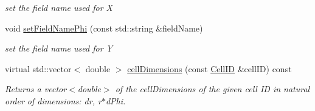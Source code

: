 \begin{DoxyCompactItemize}
\begin{DoxyCompactList}\small\item\em set the field name used for X \item\end{DoxyCompactList}\item 
void \hyperlink{class_d_d4hep_1_1_d_d_segmentation_1_1_polar_grid_r_phi2_a6cd00f3574bc968232a95d1204238c14}{setFieldNamePhi} (const std::string \&fieldName)
\begin{DoxyCompactList}\small\item\em set the field name used for Y \item\end{DoxyCompactList}\item 
virtual std::vector$<$ double $>$ \hyperlink{class_d_d4hep_1_1_d_d_segmentation_1_1_polar_grid_r_phi2_a15d4dfe8784e9ec12a6d801231925b12}{cellDimensions} (const \hyperlink{namespace_d_d4hep_1_1_d_d_segmentation_ac7af071d85cb48820914434a07e21ba1}{CellID} \&cellID) const 
\begin{DoxyCompactList}\small\item\em Returns a vector$<$double$>$ of the cellDimensions of the given cell ID in natural order of dimensions: dr, r$\ast$dPhi. \item\end{DoxyCompactList}\end{DoxyCompactItemize}
